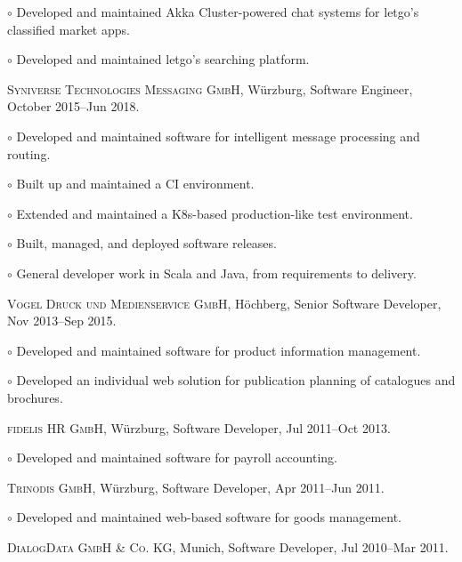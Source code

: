 \documentclass[letterpaper]{article}
\renewenvironment{itemize}{
  \begin{list}{}{
    \setlength{\leftmargin}{1.5em}
  }
}{
  \end{list}
}
\newenvironment{no-indent-itemize}{
  \begin{list}{}{
    \setlength{\leftmargin}{0em}
  }
}{
  \end{list}
}
\def\bullet{$\circ$\xspace}
\begin{document}
\begin{no-indent-itemize}
\begin{itemize}
    \item\bullet Developed and maintained Akka Cluster-powered chat systems for letgo's classified market apps.
    \item\bullet Developed and maintained letgo's searching platform.
  \end{itemize}
  \item \textsc{Syniverse Technologies Messaging GmbH}, Würzburg, Software Engineer, October 2015--Jun 2018.
  \begin{itemize}
    \item\bullet Developed and maintained software for intelligent message processing and routing.
    \item\bullet Built up and maintained a CI environment.
    \item\bullet Extended and maintained a K8s-based production-like test environment.
    \item\bullet Built, managed, and deployed software releases.
    \item\bullet General developer work in Scala and Java, from requirements to delivery.
  \end{itemize}
  \item \textsc{Vogel Druck und Medienservice GmbH}, Höchberg, Senior Software Developer, Nov 2013--Sep 2015.
  \begin{itemize}
    \item\bullet Developed and maintained software for product information management.
    \item\bullet Developed an individual web solution for publication planning of catalogues and brochures.
  \end{itemize}
  \item \textsc{fidelis HR GmbH}, Würzburg, Software Developer, Jul 2011--Oct 2013.
  \begin{itemize}
    \item\bullet Developed and maintained software for payroll accounting.
  \end{itemize}
  \item \textsc{Trinodis GmbH}, Würzburg, Software Developer, Apr 2011--Jun 2011.
  \begin{itemize}
    \item\bullet Developed and maintained web-based software for goods management.
  \end{itemize}
  \item \textsc{DialogData GmbH \& Co. KG}, Munich, Software Developer, Jul 2010--Mar 2011.
  \begin{itemize}

\end{itemize}
\end{no-indent-itemize}
\end{document}
